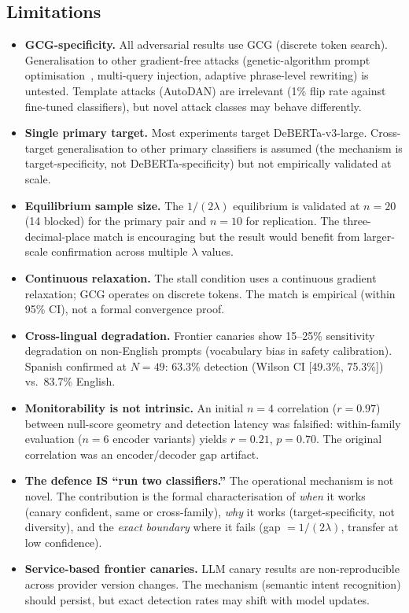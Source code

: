 \documentclass{article}
\begin{document}
\subsection{Limitations}

\begin{itemize}
\item \textbf{GCG-specificity.} All adversarial results use GCG (discrete token search). Generalisation to other gradient-free attacks (genetic-algorithm prompt optimisation~\citep{liu2024autodan}, multi-query injection, adaptive phrase-level rewriting) is untested. Template attacks (AutoDAN) are irrelevant (1\% flip rate against fine-tuned classifiers), but novel attack classes may behave differently.

\item \textbf{Single primary target.} Most experiments target DeBERTa-v3-large. Cross-target generalisation to other primary classifiers is assumed (the mechanism is target-specificity, not DeBERTa-specificity) but not empirically validated at scale.

\item \textbf{Equilibrium sample size.} The $1/(2\lambda)$ equilibrium is validated at $n{=}20$ (14 blocked) for the primary pair and $n{=}10$ for replication. The three-decimal-place match is encouraging but the result would benefit from larger-scale confirmation across multiple $\lambda$ values.

\item \textbf{Continuous relaxation.} The stall condition uses a continuous gradient relaxation; GCG operates on discrete tokens. The match is empirical (within 95\% CI), not a formal convergence proof.

\item \textbf{Cross-lingual degradation.} Frontier canaries show 15--25\% sensitivity degradation on non-English prompts (vocabulary bias in safety calibration). Spanish confirmed at $N{=}49$: 63.3\% detection (Wilson CI [49.3\%, 75.3\%]) vs.\ 83.7\% English.

\item \textbf{Monitorability is not intrinsic.} An initial $n{=}4$ correlation ($r = 0.97$) between null-score geometry and detection latency was falsified: within-family evaluation ($n{=}6$ encoder variants) yields $r = 0.21$, $p = 0.70$. The original correlation was an encoder/decoder gap artifact.

\item \textbf{The defence IS ``run two classifiers.''} The operational mechanism is not novel. The contribution is the formal characterisation of \emph{when} it works (canary confident, same or cross-family), \emph{why} it works (target-specificity, not diversity), and the \emph{exact boundary} where it fails (gap $= 1/(2\lambda)$, transfer at low confidence).

\item \textbf{Service-based frontier canaries.} LLM canary results are non-reproducible across provider version changes. The mechanism (semantic intent recognition) should persist, but exact detection rates may shift with model updates.
\end{itemize}
\end{document}
